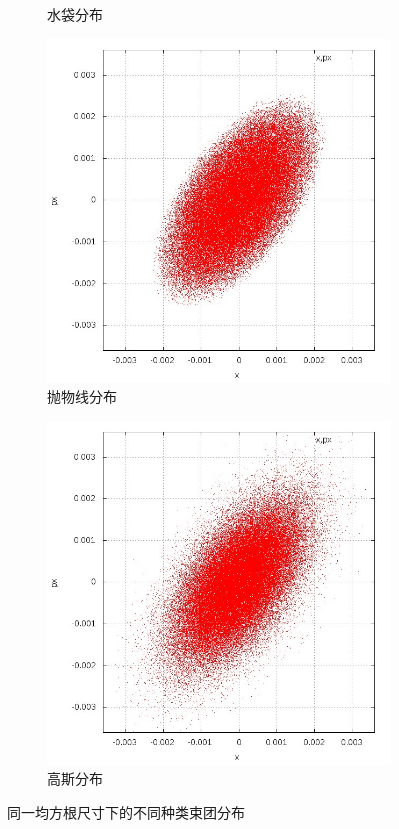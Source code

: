 \begin{figure}[!htb]
\begin{subfigure}[b]{0.40\textwidth}
        \caption{水袋分布}
    \end{subfigure}
    \begin{subfigure}[b]{0.40\textwidth}
        \includegraphics[width=\textwidth]{Img/PB_x_dx.jpg}
        \caption{抛物线分布}
    \end{subfigure}
    \begin{subfigure}[b]{0.40\textwidth}
        \includegraphics[width=\textwidth]{Img/GS_x_dx.jpg}
        \caption{高斯分布}
    \end{subfigure}
    \caption{同一均方根尺寸下的不同种类束团分布}\label{fig:distribution}
\end{figure}

